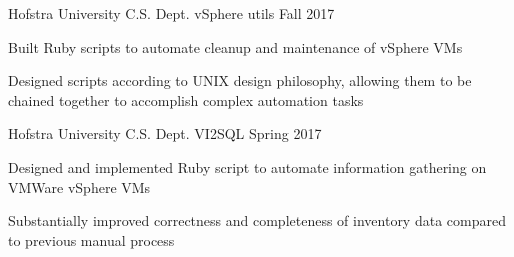 \begin{cventries}

\cventry    
  {Hofstra University C.S. Dept.} %
  {vSphere utils} %
  {}
  {Fall 2017}
  {
    \begin{cvitems} %
    \item {Built Ruby scripts to automate cleanup and maintenance of vSphere VMs}
    \item {Designed scripts according to UNIX design philosophy, allowing them to be chained together to accomplish complex automation tasks}
    \end{cvitems}
  }
   
\cventry
    {Hofstra University C.S. Dept.} %
    {VI2SQL} %
    {}
    {Spring 2017}
    {
      \begin{cvitems} %
        \item {Designed and implemented Ruby script to automate information gathering on VMWare vSphere VMs}
        \item {Substantially improved correctness and completeness of inventory data compared to previous manual process}
      \end{cvitems}
    }

\end{cventries}